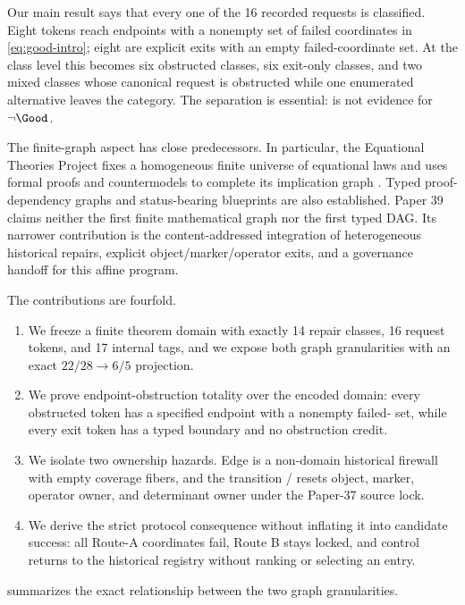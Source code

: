 Our main result says that every one of the 16 recorded requests is classified.
Eight tokens reach endpoints with a nonempty set of failed coordinates in
\cref{eq:good-intro}; eight are explicit exits with an empty failed-coordinate
set.  At the class level this becomes six obstructed classes, six exit-only
classes, and two mixed classes whose canonical request is obstructed while one
enumerated alternative leaves the category.  The separation is essential:
\Exit{} is not evidence for $\neg\Good$.

The finite-graph aspect has close predecessors.  In particular, the Equational
Theories Project fixes a homogeneous finite universe of equational laws and
uses formal proofs and countermodels to complete its implication graph
\citep{BolanEtAl2025ETP}.  Typed proof-dependency graphs and status-bearing
blueprints are also established.  Paper 39 claims neither the first finite
mathematical graph nor the first typed DAG.  Its narrower contribution is the
content-addressed integration of heterogeneous historical repairs, explicit
object/marker/operator exits, and a governance handoff for this affine program.

The contributions are fourfold.
\begin{enumerate}
  \item We freeze a finite theorem domain with exactly 14 repair classes, 16
  request tokens, and 17 internal tags, and we expose both graph granularities
  with an exact $22/28\to6/5$ projection.
  \item We prove endpoint-obstruction totality over the encoded domain: every
  obstructed token has a specified endpoint with a nonempty failed-\Good{} set,
  while every exit token has a typed boundary and no obstruction credit.
  \item We isolate two ownership hazards.  Edge  is a non-domain
  historical firewall with empty coverage fibers, and the transition
  / resets object, marker, operator owner, and
  determinant owner under the Paper-37 source lock.
  \item We derive the strict protocol consequence without inflating it into
  candidate success: all Route-A coordinates fail, Route B stays locked, and
  control returns to the historical registry without ranking or selecting an
  entry.
\end{enumerate}

 summarizes the exact relationship between the two
graph granularities.

